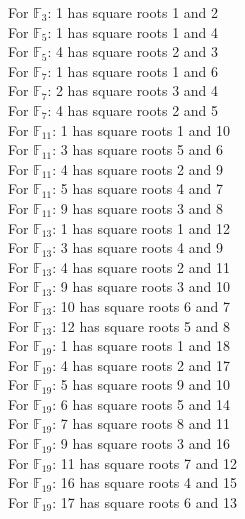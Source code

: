 \documentclass[12pt]{article}
\begin{document}
\begin{itemize}
\begin{comment}
function findRoots(p) {
  for(var i = 1; i < p; i ++) {
    for(var j = 1; j <p; j++) {
      if((j*j)%
        console.log(`For $\\mathbb{F}_{${p}}$: ${i} has square roots ${j} and ${-1*j+p}\\\\`)
        break
			\}
		\}
	\}
\}

findRoots(3);
findRoots(5);
findRoots(7);
findRoots(11);
findRoots(13);
findRoots(19);
$
\end{comment}

For $\mathbb{F}_{3}$: 1 has square roots 1 and 2\\
For $\mathbb{F}_{5}$: 1 has square roots 1 and 4\\
For $\mathbb{F}_{5}$: 4 has square roots 2 and 3\\
For $\mathbb{F}_{7}$: 1 has square roots 1 and 6\\
For $\mathbb{F}_{7}$: 2 has square roots 3 and 4\\
For $\mathbb{F}_{7}$: 4 has square roots 2 and 5\\
For $\mathbb{F}_{11}$: 1 has square roots 1 and 10\\
For $\mathbb{F}_{11}$: 3 has square roots 5 and 6\\
For $\mathbb{F}_{11}$: 4 has square roots 2 and 9\\
For $\mathbb{F}_{11}$: 5 has square roots 4 and 7\\
For $\mathbb{F}_{11}$: 9 has square roots 3 and 8\\
For $\mathbb{F}_{13}$: 1 has square roots 1 and 12\\
For $\mathbb{F}_{13}$: 3 has square roots 4 and 9\\
For $\mathbb{F}_{13}$: 4 has square roots 2 and 11\\
For $\mathbb{F}_{13}$: 9 has square roots 3 and 10\\
For $\mathbb{F}_{13}$: 10 has square roots 6 and 7\\
For $\mathbb{F}_{13}$: 12 has square roots 5 and 8\\
For $\mathbb{F}_{19}$: 1 has square roots 1 and 18\\
For $\mathbb{F}_{19}$: 4 has square roots 2 and 17\\
For $\mathbb{F}_{19}$: 5 has square roots 9 and 10\\
For $\mathbb{F}_{19}$: 6 has square roots 5 and 14\\
For $\mathbb{F}_{19}$: 7 has square roots 8 and 11\\
For $\mathbb{F}_{19}$: 9 has square roots 3 and 16\\
For $\mathbb{F}_{19}$: 11 has square roots 7 and 12\\
For $\mathbb{F}_{19}$: 16 has square roots 4 and 15\\
For $\mathbb{F}_{19}$: 17 has square roots 6 and 13\\


\end{itemize}
\end{document}
